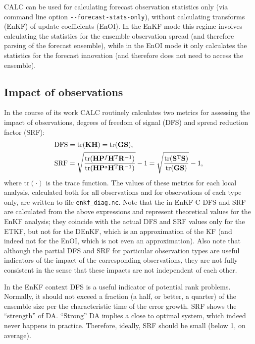 \documentclass[11pt]{report}
\newcommand{\mb} {\mathbf}
\newcommand{\T}{^{\tiny \mathrm T}}
\begin{document}
CALC can be used for calculating forecast observation statistics only (via command line option \verb|--forecast-stats-only|), without calculating transforms (EnKF) of update coefficients (EnOI).
In the EnKF mode this regime involves calculating the statistics for the ensemble observation spread (and therefore parsing of the forecast ensemble), while in the EnOI mode it only calculates the statistics for the forecast innovation (and therefore does not need to access the ensemble).

\subsection{Impact of observations}
\label{sec:impact}

In the course of its work CALC routinely calculates two metrics for assessing the impact of observations, degrees of freedom of signal (DFS) and spread reduction factor (SRF):
\begin{align*}
  & \mathrm{DFS} = \mathrm{tr}(\mb K \mb H) = \mathrm{tr}(\mb G \mb S), \\
  & \mathrm{SRF} = \sqrt{\frac{\mathrm{tr}(\mb H \mb P^f \mb H\T \mb R^{-1})}{\mathrm{tr}(\mb H \mb P^a \mb H\T \mb R^{-1})}} - 1 = \sqrt{\frac{\mathrm{tr}(\mb S\T \mb S)}{\mathrm{tr}(\mb G \mb S)}} - 1,
\end{align*}
where $\mathrm{tr}(\cdot)$ is the trace function.
The values of these metrics for each local analysis, calculated both for all observations and for observations of each type only, are written to file \verb|enkf_diag.nc|.
Note that the in EnKF-C DFS and SRF are calculated from the above expressions and represent theoretical values for the EnKF analysis; they coincide with the actual DFS and SRF values only for the ETKF, but not for the DEnKF, which is an approximation of the KF (and indeed not for the EnOI, which is not even an approximation).
Also note that although the partial DFS and SRF for particular observation types are useful indicators of the impact of the corresponding observations, they are not fully consistent in the sense that these impacts are not independent of each other.

In the EnKF context DFS is a useful indicator of potential rank problems.
Normally, it should not exceed a fraction (a half, or better, a quarter) of the ensemble size per the characteristic time of the error growth.
SRF shows the ``strength'' of DA.
``Strong'' DA implies a close to optimal system, which indeed never happens in practice.
Therefore, ideally, SRF should be small (below 1, on average).
\end{document}
